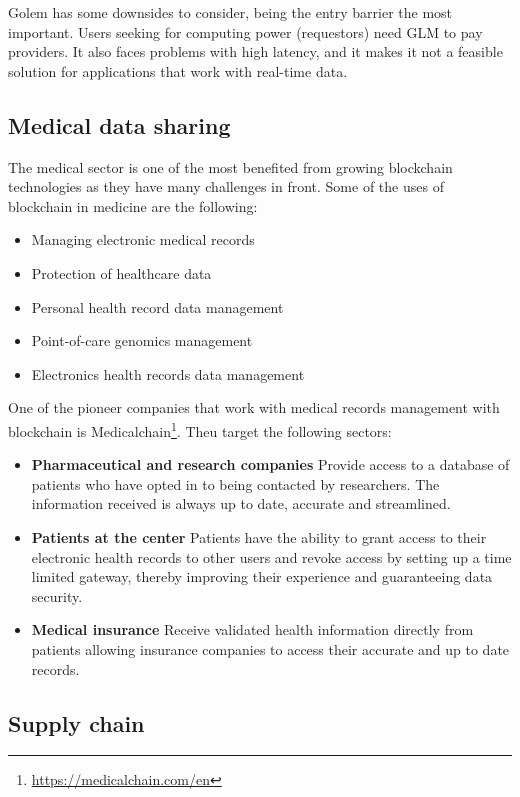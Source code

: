 \documentclass[10pt]{article}
\begin{document}
\begin{multicols}{2}
Golem has some downsides to consider, being the entry barrier the most important. Users seeking for computing power (requestors) need GLM to pay providers. It also faces problems with high latency, and it makes it not a feasible solution for applications that work with real-time data.

\subsection{Medical data sharing}

The medical sector is one of the most benefited from growing blockchain technologies as they have many challenges in front. Some of the uses of blockchain in medicine are the following:

\begin{itemize}
	\item Managing electronic medical records
	\item Protection of healthcare data
	\item Personal health record data management
	\item Point-of-care genomics management
	\item Electronics health records data management
\end{itemize}

One of the pioneer companies that work with medical records management with blockchain is Medicalchain\footnote{\url{https://medicalchain.com/en}}. Theu target the following sectors:

\begin{itemize}
	\item \textbf{Pharmaceutical and research companies} Provide access to a database of patients who have opted in to being contacted by researchers. The information received is always up to date, accurate and streamlined.
	\item \textbf{Patients at the center} Patients have the ability to grant access to their electronic health records to other users and revoke access by setting up a time limited gateway, thereby improving their experience and guaranteeing data security.
	\item \textbf{Medical insurance} Receive validated health information directly from patients allowing insurance companies to access their accurate and up to date records.
\end{itemize}

\subsection{Supply chain}


\end{multicols}
\end{document}
